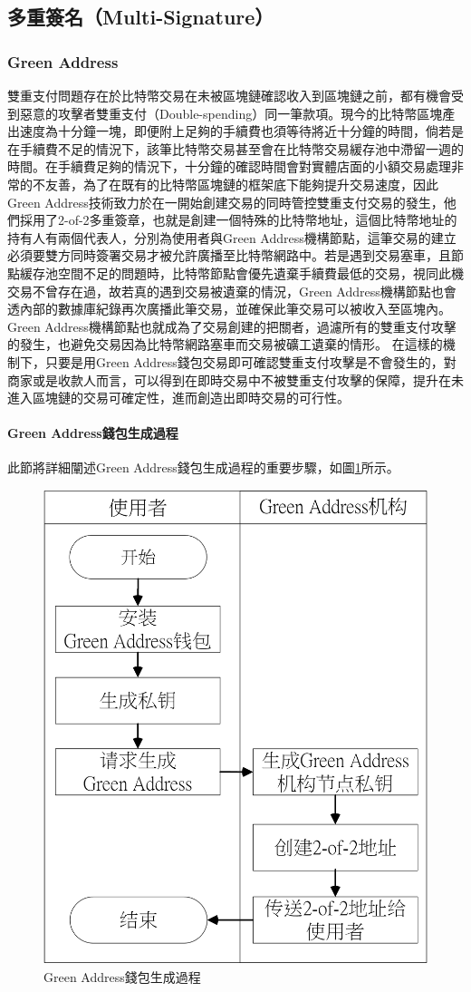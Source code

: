 		\subsection{多重簽名（Multi-Signature）}
		 	\subsubsection{Green Address}
		 	雙重支付問題存在於比特幣交易在未被區塊鏈確認收入到區塊鏈之前，都有機會受到惡意的攻擊者雙重支付（Double-spending）\supercite{Informationpropagationinthebitcoinnetwork}同一筆款項。現今的比特幣區塊產出速度為十分鐘一塊，即便附上足夠的手續費也須等待將近十分鐘的時間，倘若是在手續費不足的情況下，該筆比特幣交易甚至會在比特幣交易緩存池中滯留一週的時間。在手續費足夠的情況下，十分鐘的確認時間會對實體店面的小額交易處理非常的不友善，為了在既有的比特幣區塊鏈的框架底下能夠提升交易速度，因此Green Address技術致力於在一開始創建交易的同時管控雙重支付交易的發生，他們採用了2-of-2多重簽章，也就是創建一個特殊的比特幣地址，這個比特幣地址的持有人有兩個代表人，分別為使用者與Green Address機構節點，這筆交易的建立必須要雙方同時簽署交易才被允許廣播至比特幣網路中。若是遇到交易塞車，且節點緩存池空間不足的問題時，比特幣節點會優先遺棄手續費最低的交易，視同此機交易不曾存在過，故若真的遇到交易被遺棄的情況，Green Address機構節點也會透內部的數據庫紀錄再次廣播此筆交易，並確保此筆交易可以被收入至區塊內。Green Address機構節點也就成為了交易創建的把關者，過濾所有的雙重支付攻擊的發生，也避免交易因為比特幣網路塞車而交易被礦工遺棄的情形。
		 	在這樣的機制下，只要是用Green Address錢包交易即可確認雙重支付攻擊是不會發生的，對商家或是收款人而言，可以得到在即時交易中不被雙重支付攻擊的保障，提升在未進入區塊鏈的交易可確定性，進而創造出即時交易的可行性。

		 	\paragraph{Green Address錢包生成過程}
		 	此節將詳細闡述Green Address錢包生成過程的重要步驟，如圖\ref{gabuild}所示。
		 	\begin{figure}[h]
				\centering
				\includegraphics[width = .5\textwidth]{gabuild.png}
				\caption{Green Address錢包生成過程}\label{gabuild}
			\end{figure}


